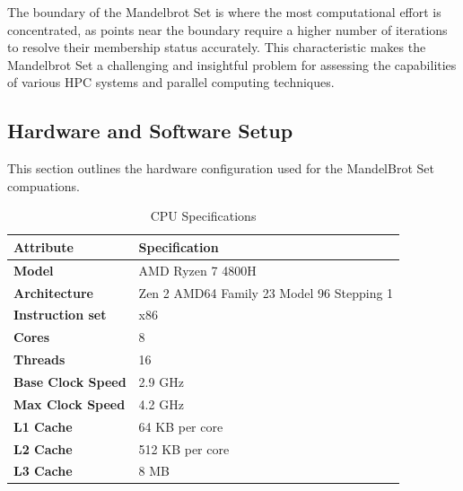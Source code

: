 \documentclass[
	report, %
	11pt, %
]{CSUniSchoolLabReport}
\newcounter{ct}
\begin{document}
The boundary of the Mandelbrot Set is where the most computational effort is concentrated, as points near the boundary require a higher number of iterations to resolve their membership status accurately. This characteristic makes the Mandelbrot Set a challenging and insightful problem for assessing the capabilities of various HPC systems and parallel computing techniques.
\pagebreak

\subsection{Hardware and Software Setup} \label{ssec:Hardware and Software Setup}

This section outlines the hardware configuration used for the MandelBrot Set compuations.

\begin{table}[!htb]
	\captionsetup{justification=centering, width=.8\linewidth}
	\centering
	\begin{tabular}{ll}
		\hline
		\textbf{Attribute}        & \textbf{Specification}                    \\
		\hline
		\textbf{Model}            & AMD Ryzen 7 4800H                         \\
		\textbf{Architecture}     & Zen 2 AMD64 Family 23 Model 96 Stepping 1 \\
		\textbf{Instruction set}  & x86                                       \\
		\textbf{Cores}            & 8                                         \\
		\textbf{Threads}          & 16                                        \\
		\textbf{Base Clock Speed} & 2.9 GHz                                   \\
		\textbf{Max Clock Speed}  & 4.2 GHz                                   \\
		\textbf{L1 Cache}         & 64 KB per core                            \\
		\textbf{L2 Cache}         & 512 KB per core                           \\
		\textbf{L3 Cache}         & 8 MB                                      \\
		\hline
	\end{tabular}
	\caption{CPU Specifications}
	\label{tab:cpu_specs}
\end{table}
\end{document}
